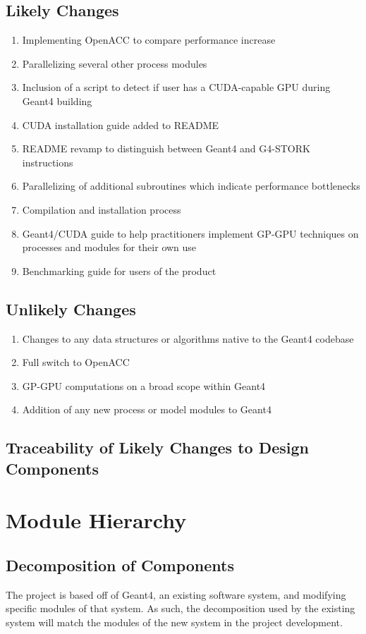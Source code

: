\documentclass[12pt]{article}
\begin{document}
\subsection{Likely Changes} %
\begin{enumerate}
\item Implementing OpenACC to compare performance increase
\item Parallelizing several other process modules
\item Inclusion of a script to detect if user has a CUDA-capable GPU during Geant4 building
\item CUDA installation guide added to README
\item README revamp to distinguish between Geant4 and G4-STORK instructions
\item Parallelizing of additional subroutines which indicate performance bottlenecks
\item Compilation and installation process
\item Geant4/CUDA guide to help practitioners implement GP-GPU techniques on processes and modules for their own use
\item Benchmarking guide for users of the product
\end{enumerate}

\subsection{Unlikely Changes} %
\begin{enumerate}
\item Changes to any data structures or algorithms native to the Geant4 codebase
\item Full switch to OpenACC
\item GP-GPU computations on a broad scope within Geant4
\item Addition of any new process or model modules to Geant4
\end{enumerate}

\subsection{Traceability of Likely Changes to Design Components}

\section{Module Hierarchy}%
\subsection{Decomposition of Components}
The project is based off of Geant4, an existing software system, and modifying specific modules of that system. As such, the decomposition used by the existing system will match the modules of the new system in the project development.\\
\end{document}
